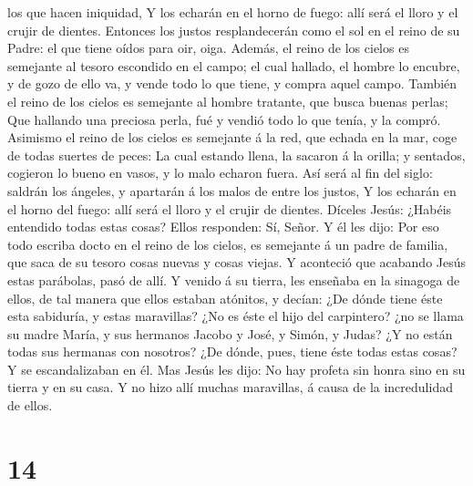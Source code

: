 los que hacen iniquidad,  Y los echarán en el horno de
fuego: allí será el lloro y el crujir de dientes. 
Entonces los justos resplandecerán como el sol en el reino de su Padre:
el que tiene oídos para oir, oiga.  Además, el reino de
los cielos es semejante al tesoro escondido en el campo; el cual
hallado, el hombre lo encubre, y de gozo de ello va, y vende todo lo que
tiene, y compra aquel campo.  También el reino de los
cielos es semejante al hombre tratante, que busca buenas perlas;
 Que hallando una preciosa perla, fué y vendió todo lo
que tenía, y la compró.  Asimismo el reino de los cielos
es semejante á la red, que echada en la mar, coge de todas suertes de
peces:  La cual estando llena, la sacaron á la orilla; y
sentados, cogieron lo bueno en vasos, y lo malo echaron fuera.
 Así será al fin del siglo: saldrán los ángeles, y
apartarán á los malos de entre los justos,  Y los echarán
en el horno del fuego: allí será el lloro y el crujir de dientes.
 Díceles Jesús: ¿Habéis entendido todas estas cosas?
Ellos responden: Sí, Señor.  Y él les dijo: Por eso todo
escriba docto en el reino de los cielos, es semejante á un padre de
familia, que saca de su tesoro cosas nuevas y cosas viejas.
 Y aconteció que acabando Jesús estas parábolas, pasó de
allí.  Y venido á su tierra, les enseñaba en la sinagoga
de ellos, de tal manera que ellos estaban atónitos, y decían: ¿De dónde
tiene éste esta sabiduría, y estas maravillas?  ¿No es
éste el hijo del carpintero? ¿no se llama su madre María, y sus hermanos
Jacobo y José, y Simón, y Judas?  ¿Y no están todas sus
hermanas con nosotros? ¿De dónde, pues, tiene éste todas estas cosas?
 Y se escandalizaban en él. Mas Jesús les dijo: No hay
profeta sin honra sino en su tierra y en su casa.  Y no
hizo allí muchas maravillas, á causa de la incredulidad de ellos.

\hypertarget{section-13}{%
\section{14}\label{section-13}}

